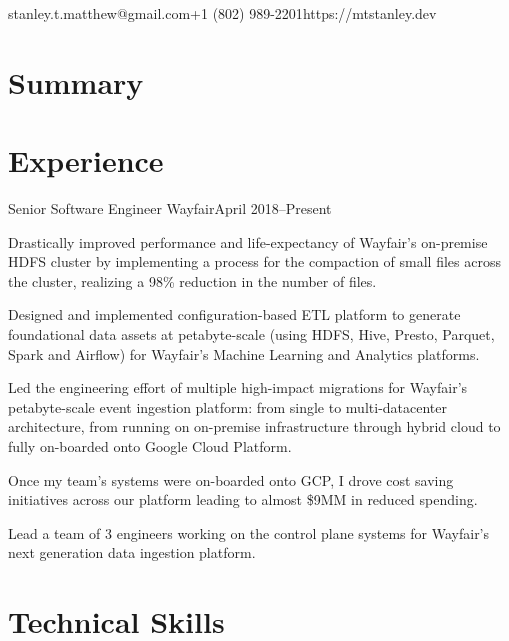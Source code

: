 \documentclass[10pt]{resume}
\begin{document}

\vspace{0.5em}
{stanley.t.matthew@gmail.com}{+1 (802) 989-2201}{https://mtstanley.dev}

\section{Summary}


\section{Experience}

\expblock
{Senior Software Engineer \textnormal{Wayfair}}{April 2018--Present}
{

    \item Drastically improved performance and life-expectancy of Wayfair's
        on-premise HDFS cluster by implementing a process for the compaction of
        small files across the cluster, realizing a 98\% reduction in the
        number of files.

    \item Designed and implemented configuration-based ETL platform to generate
        foundational data assets at petabyte-scale (using HDFS, Hive, Presto,
        Parquet, Spark and Airflow) for Wayfair's Machine Learning and Analytics
        platforms.

    \item Led the engineering effort of multiple high-impact migrations for
        Wayfair's petabyte-scale event ingestion platform: from single to
        multi-datacenter architecture, from running on on-premise infrastructure
        through hybrid cloud to fully on-boarded onto Google Cloud Platform.

    \item Once my team's systems were on-boarded onto GCP, I drove cost saving
        initiatives across our platform leading to almost \$9MM in reduced
        spending.

    \item Lead a team of 3 engineers working on the control plane systems for
        Wayfair's next generation data ingestion platform.

}

\section{Technical Skills}
\end{document}
